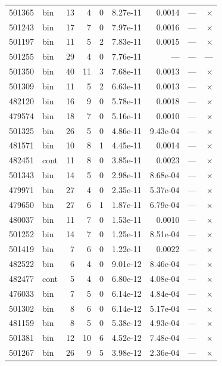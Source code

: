 \begin{longtable}{rlrrrrrrr}
  501365 & bin & 13 & 4 & 0 & 8.27e-11 & 0.0014 & --- & $\times$ \\
  501243 & bin & 17 & 7 & 0 & 7.97e-11 & 0.0016 & --- & $\times$ \\
  501197 & bin & 11 & 5 & 2 & 7.83e-11 & 0.0015 & --- & $\times$ \\
  501255 & bin & 29 & 4 & 0 & 7.76e-11 & --- & --- & --- \\
  501350 & bin & 40 & 11 & 3 & 7.68e-11 & 0.0013 & --- & $\times$ \\
  501309 & bin & 11 & 5 & 2 & 6.63e-11 & 0.0013 & --- & $\times$ \\
  482120 & bin & 16 & 9 & 0 & 5.78e-11 & 0.0018 & --- & $\times$ \\
  479574 & bin & 18 & 7 & 0 & 5.16e-11 & 0.0010 & --- & $\times$ \\
  501325 & bin & 26 & 5 & 0 & 4.86e-11 & 9.43e-04 & --- & $\times$ \\
  481571 & bin & 10 & 8 & 1 & 4.45e-11 & 0.0014 & --- & $\times$ \\
  482451 & cont & 11 & 8 & 0 & 3.85e-11 & 0.0023 & --- & $\times$ \\
  501343 & bin & 14 & 5 & 0 & 2.98e-11 & 8.68e-04 & --- & $\times$ \\
  479971 & bin & 27 & 4 & 0 & 2.35e-11 & 5.37e-04 & --- & $\times$ \\
  479650 & bin & 27 & 6 & 1 & 1.87e-11 & 6.79e-04 & --- & $\times$ \\
  480037 & bin & 11 & 7 & 0 & 1.53e-11 & 0.0010 & --- & $\times$ \\
  501252 & bin & 14 & 7 & 0 & 1.25e-11 & 8.51e-04 & --- & $\times$ \\
  501419 & bin & 7 & 6 & 0 & 1.22e-11 & 0.0022 & --- & $\times$ \\
  482522 & bin & 6 & 4 & 0 & 9.01e-12 & 8.46e-04 & --- & $\times$ \\
  482477 & cont & 5 & 4 & 0 & 6.80e-12 & 4.08e-04 & --- & $\times$ \\
  476033 & bin & 7 & 5 & 0 & 6.14e-12 & 4.84e-04 & --- & $\times$ \\
  501302 & bin & 8 & 6 & 0 & 6.14e-12 & 5.17e-04 & --- & $\times$ \\
  481159 & bin & 8 & 5 & 0 & 5.38e-12 & 4.93e-04 & --- & $\times$ \\
  501381 & bin & 12 & 10 & 6 & 4.52e-12 & 7.48e-04 & --- & $\times$ \\
  501267 & bin & 26 & 9 & 5 & 3.98e-12 & 2.36e-04 & --- & $\times$ \\

\end{longtable}
